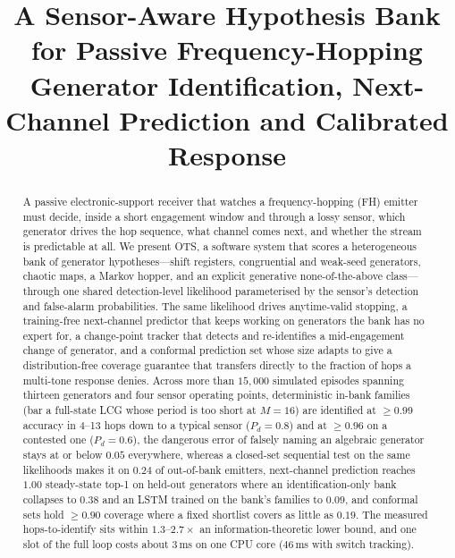\documentclass[conference]{IEEEtran}
\begin{document}
\title{A Sensor-Aware Hypothesis Bank for Passive Frequency-Hopping
Generator Identification, Next-Channel Prediction and Calibrated Response}

\author{
}

\maketitle

\begin{abstract}
A passive electronic-support receiver that watches a frequency-hopping (FH)
emitter must decide, inside a short engagement window and through a lossy
sensor, which generator drives the hop sequence, what channel comes next, and
whether the stream is predictable at all. We present OTS, a software system
that scores a heterogeneous bank of generator hypotheses---shift registers,
congruential and weak-seed generators, chaotic maps, a Markov hopper, and an
explicit generative none-of-the-above class---through one shared
detection-level likelihood parameterised by the sensor's detection and
false-alarm probabilities. The same likelihood drives anytime-valid stopping,
a training-free next-channel predictor that keeps working on generators the
bank has no expert for, a change-point tracker that detects and re-identifies a
mid-engagement change of generator, and a conformal prediction set whose size
adapts to give a distribution-free coverage guarantee that transfers directly
to the fraction of hops a multi-tone response denies. Across more than
$15{,}000$ simulated episodes spanning thirteen generators and four sensor
operating points, deterministic in-bank families (bar a full-state LCG
whose period is too short at $M{=}16$) are identified at $\geq 0.99$ accuracy
in 4--13 hops down to a typical sensor ($P_d{=}0.8$) and at $\geq 0.96$ on a
contested one ($P_d{=}0.6$), the dangerous error of falsely naming an
algebraic generator stays at or below $0.05$ everywhere, whereas a closed-set
sequential test on the same likelihoods makes it on $0.24$ of out-of-bank
emitters, next-channel prediction reaches
$1.00$ steady-state top-1 on held-out generators where an identification-only
bank collapses to $0.38$ and an LSTM trained on the bank's families to $0.09$, and conformal sets hold $\geq 0.90$
coverage where a fixed shortlist covers as little as $0.19$. The measured
hops-to-identify sits within $1.3$--$2.7\times$ an information-theoretic lower
bound, and one slot of the full loop costs about $3$\,ms on one CPU core ($46$\,ms with switch tracking).
\end{abstract}
\end{document}
